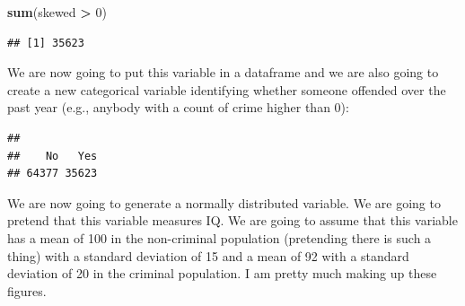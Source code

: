 \documentclass[]{book}
\newenvironment{Shaded}{\begin{snugshade}}{\end{snugshade}}
\newcommand{\CommentTok}[1]{\textcolor[rgb]{0.56,0.35,0.01}{\textit{#1}}}
\newcommand{\DataTypeTok}[1]{\textcolor[rgb]{0.13,0.29,0.53}{#1}}
\newcommand{\DecValTok}[1]{\textcolor[rgb]{0.00,0.00,0.81}{#1}}
\newcommand{\KeywordTok}[1]{\textcolor[rgb]{0.13,0.29,0.53}{\textbf{#1}}}
\newcommand{\NormalTok}[1]{#1}
\newcommand{\OperatorTok}[1]{\textcolor[rgb]{0.81,0.36,0.00}{\textbf{#1}}}
\newcommand{\StringTok}[1]{\textcolor[rgb]{0.31,0.60,0.02}{#1}}
\theoremstyle{definition}
\theoremstyle{definition}
\theoremstyle{definition}
\theoremstyle{remark}
\begin{document}
\begin{Shaded}
\begin{Highlighting}[]
\KeywordTok{sum}\NormalTok{(skewed }\OperatorTok{>}\StringTok{ }\DecValTok{0}\NormalTok{)}
\end{Highlighting}
\end{Shaded}

\begin{verbatim}
## [1] 35623
\end{verbatim}

We are now going to put this variable in a dataframe and we are also
going to create a new categorical variable identifying whether someone
offended over the past year (e.g., anybody with a count of crime higher
than 0):

\begin{Shaded}
\end{Shaded}

\begin{verbatim}
## 
##    No   Yes 
## 64377 35623
\end{verbatim}

We are now going to generate a normally distributed variable. We are
going to pretend that this variable measures IQ. We are going to assume
that this variable has a mean of 100 in the non-criminal population
(pretending there is such a thing) with a standard deviation of 15 and a
mean of 92 with a standard deviation of 20 in the criminal population. I
am pretty much making up these figures.
\end{document}
